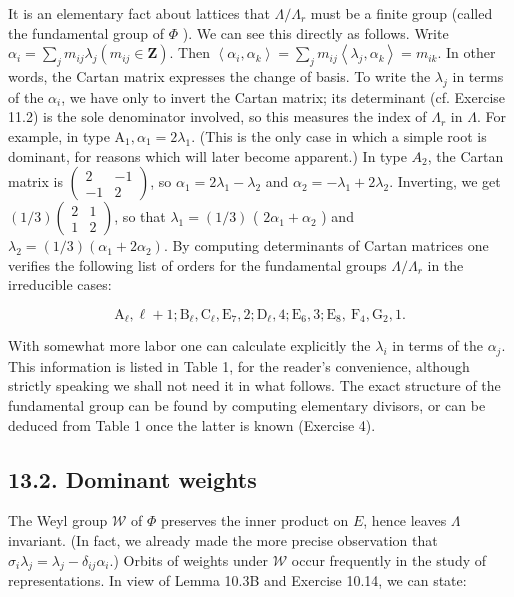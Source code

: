 \documentclass[10pt]{article}
\begin{document}
It is an elementary fact about lattices that $\Lambda / \Lambda_{r}$ must be a finite group (called the fundamental group of $\Phi$ ). We can see this directly as follows. Write $\alpha_{i}=\sum_{j} m_{i j} \lambda_{j}\left(m_{i j} \in \mathbf{Z}\right)$. Then $\left\langle\alpha_{i}, \alpha_{k}\right\rangle=\sum_{j} m_{i j}\left\langle\lambda_{j}, \alpha_{k}\right\rangle=m_{i k}$. In other words, the Cartan matrix expresses the change of basis. To write the $\lambda_{j}$ in terms of the $\alpha_{i}$, we have only to invert the Cartan matrix; its determinant (cf. Exercise 11.2) is the sole denominator involved, so this measures the index of $\Lambda_{r}$ in $\Lambda$. For example, in type $\mathrm{A}_{1}, \alpha_{1}=2 \lambda_{1}$. (This is the only case in which a simple root is dominant, for reasons which will later become apparent.) In type $A_{2}$, the Cartan matrix is $\left(\begin{array}{rr}2 & -1 \\ -1 & 2\end{array}\right)$, so $\alpha_{1}=2 \lambda_{1}-\lambda_{2}$ and $\alpha_{2}=-\lambda_{1}+2 \lambda_{2}$. Inverting, we get $(1 / 3)\left(\begin{array}{ll}2 & 1 \\ 1 & 2\end{array}\right)$, so that $\lambda_{1}=(1 / 3)$ ( $2 \alpha_{1}+\alpha_{2}$ ) and $\lambda_{2}=(1 / 3)\left(\alpha_{1}+2 \alpha_{2}\right)$. By computing determinants of Cartan matrices one verifies the following list of orders for the fundamental groups $\Lambda / \Lambda_{r}$ in the irreducible cases:

$$
\mathrm{A}_{\ell}, \ell+1 ; \mathrm{B}_{\ell}, \mathrm{C}_{\ell}, \mathrm{E}_{7}, 2 ; \mathrm{D}_{\ell}, 4 ; \mathrm{E}_{6}, 3 ; \mathrm{E}_{8}, \mathrm{~F}_{4}, \mathrm{G}_{2}, 1 .
$$

With somewhat more labor one can calculate explicitly the $\lambda_{i}$ in terms of the $\alpha_{j}$. This information is listed in Table 1, for the reader's convenience, although strictly speaking we shall not need it in what follows. The exact structure of the fundamental group can be found by computing elementary divisors, or can be deduced from Table 1 once the latter is known (Exercise 4).

\subsection*{13.2. Dominant weights}
The Weyl group $\mathscr{W}$ of $\Phi$ preserves the inner product on $E$, hence leaves $\Lambda$ invariant. (In fact, we already made the more precise observation that $\sigma_{i} \lambda_{j}=\lambda_{j}-\delta_{i j} \alpha_{i}$.) Orbits of weights under $\mathscr{W}$ occur frequently in the study of representations. In view of Lemma 10.3B and Exercise 10.14, we can state:
\end{document}
